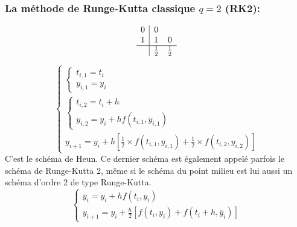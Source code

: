 \documentclass{beamer}
\begin{document}
    \begin{frame}
 \frametitle{La méthode de Runge-Kutta classique  $q=2$ (RK2):}

\[\begin{array}{c|cc}
0&0&\\
1&1 &0\\
 \hline
&\frac 12&\frac 12
\end{array}\]

\[\left\{\begin{array}{l}
 \left\{\begin{array}{l}
 t_{i,1}=t_{i}\\
 y_{i,1}=y_{i}
\end{array}\right.\\
\left\{\begin{array}{l}
 t_{i,2}=t_{i}+ h\\
 y_{i,2}=y_{i}+ hf(t_{i,1},y_{i,1})
\end{array}\right.\\

 y_{i+1}=y_{i}+h\left[\frac 12\times  f(t_{i,1},y_{i,1})+\frac 12\times f(t_{i,2},y_{i,2})\right]
\end{array}\right.\]
C'est le schéma de Heun. Ce dernier schéma est également appelé parfois le schéma de Runge-Kutta 2, même si le schéma du point milieu est lui aussi un schéma d'ordre 2 de type Runge-Kutta.
\[\left\{\begin{array}{l}
 \overline{y}_{i}=y_{i}+h f(t_{i},y_{i})\\
 y_{i+1}=y_{i}+\frac h2\left[f(t_{i},y_{i})+ f(t_{i}+h,\overline{y}_{i})\right]
\end{array}\right.\]
\end{frame}      
    
\end{document}
